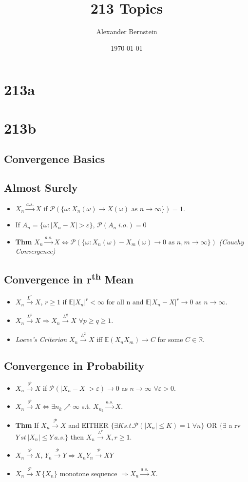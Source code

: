 \documentclass[11pt]{article}
\title{213 Topics}
\author{Alexander Bernstein}
\date{\today}
\newcommand{\bbr}{\mathbb{R}}
\renewcommand{\P}{\mathbb{P}}
\newcommand{\eps}{\varepsilon}
\newcommand{\go}{\omega}
\newcommand\abs[1]{\left|#1\right|}
\renewcommand{\to}{\longrightarrow}
\newcommand{\asto}{\overset{a.s.}{\to}}
\newcommand{\pto}{\overset{\P}{\to}}
\newcommand{\Lp}[1]{\overset{L^#1}\to}
\renewcommand{\P}{\mathcal{P}}
\newcommand{\E}{\mathbb{E}}
\newcommand{\gw}{\go}
\newcommand{\imp}{\Rightarrow}
\begin{document}
\begin{multicols}{2}
\section{213a}
\section{213b}
\subsection{Convergence Basics}
\subsection{Almost Surely}
\begin{itemize}
\item $X_n \asto X $ if $\P(\{\go: X_n(\go) \to X(\go) \textrm{ as } n \to \infty\})=1$.
\item If $A_n=\{\gw:|X_n-X|>\eps\}$, $\P(A_n\; i.o.)=0$
\item \textbf{Thm} $X_n \asto X \iff \P(\{\gw: X_n(\gw)-X_m(\gw) \to 0 \textrm{ as } n,m \to \infty\})$ \textit{(Cauchy Convergence)}
\end{itemize}
\subsection{Convergence in r\textsuperscript{th} Mean}
\begin{itemize}
\item $X_n \Lp{r} X$, $r \geq 1$ if $\E\abs{X_n}^r<\infty$ for all n and $\E\abs{X_n-X}^r \to 0$ as $n \to \infty$.
\item $X_n \Lp{p} X \imp X_n \Lp{q} X$  $\forall p \geq q \geq 1$. 
\item \textit{Loeve's Criterion} $X_n \Lp{2} X$ iff $\E(X_nX_m) \to C$ for some $C \in \bbr$.
\end{itemize}
\subsection{Convergence in Probability}
\begin{itemize}
\item $X_n \pto X$ if $\P(\abs{X_n-X}>\eps) \to 0$ as $n \to \infty$ $\forall \eps>0$.
\item $X_n \pto X \iff \exists{n_k} \nearrow \infty$ s.t. $X_{n_k} \asto X$.
\item \textbf{Thm} If $X_n \pto X$ and EITHER $\{ \exists K s.t. \P(\abs{X_n} \leq K)=1 \; \forall n \}$ OR $\{ \exists $ a rv $Y \, st \, \abs{X_n} \leq Y \, a.s. \}$ then $X_n \Lp{r} X, r \geq 1$.
\item $X_n \pto X$, $Y_n \pto Y \imp X_nY_n \pto XY$
\item $X_n \pto X \, \{X_n\}$ monotone sequence $\imp X_n \asto X$.
\end{itemize}

\end{multicols}
\end{document}
